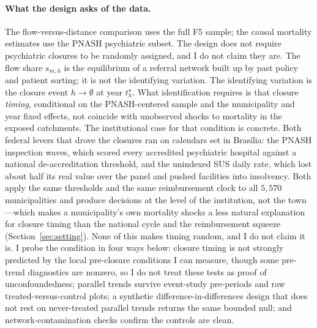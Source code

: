 \paragraph{What the design asks of the data.} The flow-versus-distance
comparison uses the full F5 sample; the causal mortality estimates use the
PNASH psychiatric subset. The design does not require psychiatric closures
to be randomly assigned, and I do not claim they are. The flow share
$s_{m,h}$ is the equilibrium of a referral network built up by past policy
and patient sorting; it is not the identifying variation. The identifying
variation is the closure event $h \to \emptyset$ at year $t_h^{\star}$.
What identification requires is that closure \emph{timing}, conditional on
the PNASH-centered sample and the municipality and year fixed effects, not
coincide with unobserved shocks to mortality in the exposed catchments.
The institutional case for that condition is concrete. Both federal levers
that drove the closures ran on calendars set in Bras\'ilia: the PNASH
inspection waves, which scored every accredited psychiatric hospital
against a national de-accreditation threshold, and the unindexed SUS daily
rate, which lost about half its real value over the panel and pushed
facilities into insolvency. Both apply the same thresholds and the same
reimbursement clock to all $5{,}570$ municipalities and produce decisions
at the level of the institution, not the town---which makes a
municipality's own mortality shocks a less natural explanation for closure
timing than the national cycle and the reimbursement squeeze
(Section~\ref{sec:setting}). None of this makes timing random, and I do not
claim it is. I probe the condition in four ways below: closure timing is not
strongly predicted by the local pre-closure conditions I can measure,
though some pre-trend diagnostics are nonzero, so I do not treat these
tests as proof of unconfoundedness; parallel trends survive event-study
pre-periods and raw treated-versus-control plots; a synthetic
difference-in-differences design that does not rest on never-treated
parallel trends returns the same bounded null; and network-contamination
checks confirm the controls are clean.

